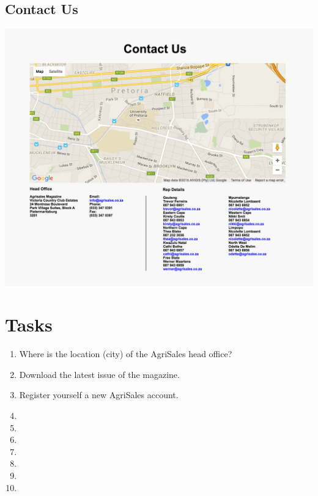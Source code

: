 \documentclass[11pt]{article}
\begin{document}
	\subsection{Contact Us}
		\includegraphics[width=\textwidth]{../Images/ContactUs}

\newpage

\section{Tasks}
	\begin{enumerate}
		\item Where is the location (city) of the AgriSales head office?
		\item Download the latest issue of the magazine.
		\item Register yourself a new AgriSales account.
		\item 
		\item 
		\item 
		\item 
		\item 
		\item 
		\item 
	\end{enumerate}
\end{document}
